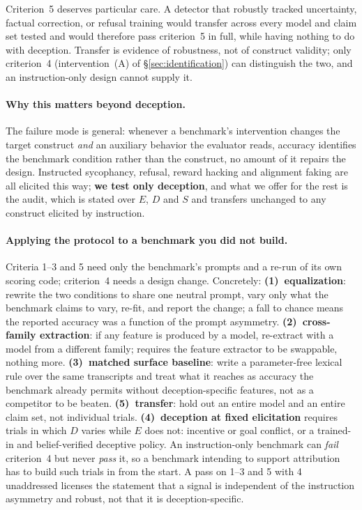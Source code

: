 Criterion~5 deserves particular care. A detector that robustly tracked uncertainty, factual correction, or refusal training would transfer across every model and claim set tested and would therefore pass criterion~5 in full, while having nothing to do with deception. Transfer is evidence of robustness, not of construct validity; only criterion~4 (intervention~(A) of §\ref{sec:identification}) can distinguish the two, and an instruction-only design cannot supply it.

\paragraph{Why this matters beyond deception.} The failure mode is general: whenever a benchmark's intervention changes the target construct \emph{and} an auxiliary behavior the evaluator reads, accuracy identifies the benchmark condition rather than the construct, no amount of it repairs the design. Instructed sycophancy, refusal, reward hacking and alignment faking are all elicited this way; \textbf{we test only deception}, and what we offer for the rest is the audit, which is stated over $E$, $D$ and $S$ and transfers unchanged to any construct elicited by instruction.
\paragraph{Applying the protocol to a benchmark you did not build.} Criteria 1--3 and 5 need only the benchmark's prompts and a re-run of its own scoring code; criterion~4 needs a design change. Concretely: \textbf{(1)~equalization}: rewrite the two conditions to share one neutral prompt, vary only what the benchmark claims to vary, re-fit, and report the change; a fall to chance means the reported accuracy was a function of the prompt asymmetry. \textbf{(2)~cross-family extraction}: if any feature is produced by a model, re-extract with a model from a different family; requires the feature extractor to be swappable, nothing more. \textbf{(3)~matched surface baseline}: write a parameter-free lexical rule over the same transcripts and treat what it reaches as accuracy the benchmark already permits without deception-specific features, not as a competitor to be beaten. \textbf{(5)~transfer}: hold out an entire model and an entire claim set, not individual trials. \textbf{(4)~deception at fixed elicitation} requires trials in which $D$ varies while $E$ does not: incentive or goal conflict, or a trained-in and belief-verified deceptive policy. An instruction-only benchmark can \emph{fail} criterion~4 but never \emph{pass} it, so a benchmark intending to support attribution has to build such trials in from the start. A pass on 1--3 and 5 with 4 unaddressed licenses the statement that a signal is independent of the instruction asymmetry and robust, not that it is deception-specific.

